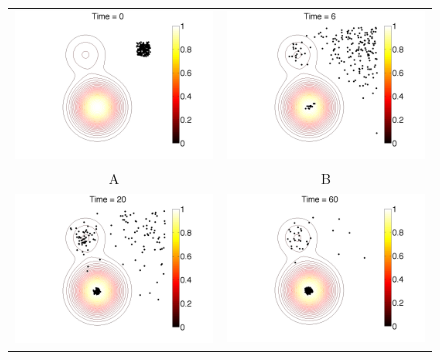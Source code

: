 \documentclass[12pt]{article}
\begin{document}
\begin{figure}[htp]
\begin{tabular}{cc}
	\includegraphics[width=3.25in]{figures/MosqVizPerturb_ruleset01_paramset013_run01_001.png} & \includegraphics[width=3.25in]{figures/MosqVizPerturb_ruleset01_paramset013_run01_025.png}\\
	A & B \\
	\includegraphics[width=3.25in]{figures/MosqVizPerturb_ruleset01_paramset013_run01_061.png} & \includegraphics[width=3.25in]{figures/MosqVizPerturb_ruleset01_paramset013_run01_111.png}\\

\end{tabular}
\end{figure}
\end{document}

